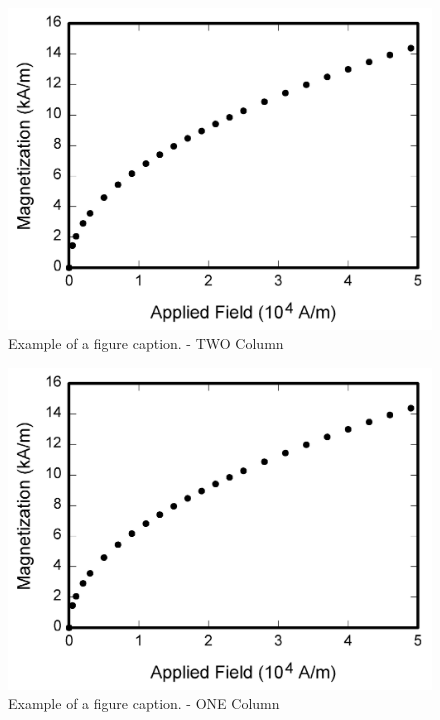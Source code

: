 


\begin{figure}[htbp]
    \includegraphics[width=\textwidth]{Photos/fig1.png}
    \caption{Example of a figure caption. - TWO Column}
    \label{fig:name3}
\end{figure}

\begin{figure}[!h]
    \includegraphics[width=\columnwidth]{Photos/fig1.png}
    \caption{Example of a figure caption. - ONE Column}
    \label{fig:name4}
\end{figure}

